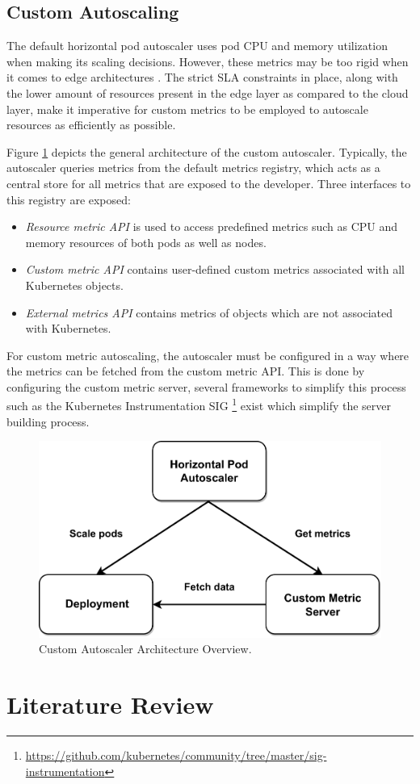 \subsection{Custom Autoscaling}
\label{subsec:custom-autoscaling}

The default horizontal pod autoscaler uses pod CPU and memory utilization when making its scaling decisions. However, these metrics may be too rigid when it comes to edge architectures \cite{coulson2020adaptive}. The strict SLA constraints in place, along with the lower amount of resources present in the edge layer as compared to the cloud layer, make it imperative for custom metrics to be employed to autoscale resources as efficiently as possible.\par

Figure \ref{fig:custom-autoscale-overview} depicts the general architecture of the custom autoscaler. Typically, the autoscaler queries metrics from the default metrics registry, which acts as a central store for all metrics that are exposed to the developer. Three interfaces to this registry are exposed:
\begin{itemize}
    \item \textit{Resource metric API} is used to access predefined metrics such as CPU and memory resources of both pods as well as nodes.
    \item \textit{Custom metric API} contains user-defined custom metrics associated with all Kubernetes objects.
    \item \textit{External metrics API} contains metrics of objects which are not associated with Kubernetes.
\end{itemize}
For custom metric autoscaling, the autoscaler must be configured in a way where the metrics can be fetched from the custom metric API. This is done by configuring the custom metric server, several frameworks to simplify this process such as the Kubernetes Instrumentation SIG \footnote{\url{https://github.com/kubernetes/community/tree/master/sig-instrumentation}} exist which simplify the server building process.

\begin{figure}[htb]
    \centering
    \includegraphics[width=.5\linewidth]{Figures/Custom-Metrics-Autoscaling.pdf}
    \caption{Custom Autoscaler Architecture Overview.}
    \label{fig:custom-autoscale-overview}
\end{figure}

\section{Literature Review}
\label{sec:lit-review}
